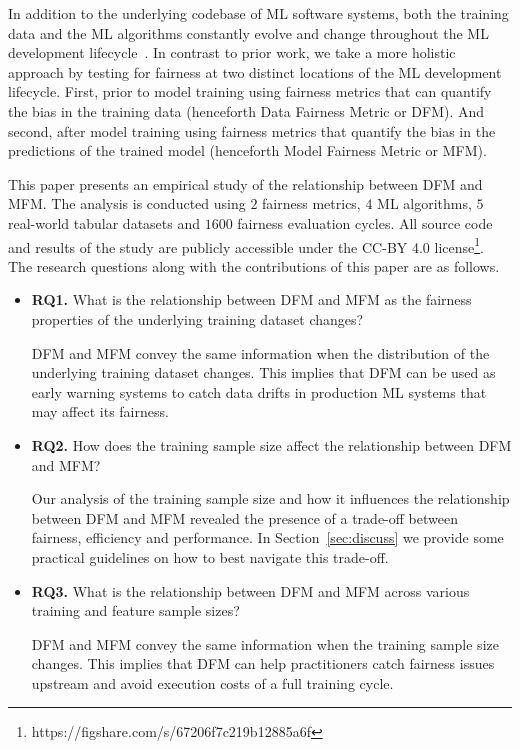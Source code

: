 \documentclass{article}
\begin{document}
In addition to the underlying codebase of ML software systems, both
the training data and the ML algorithms constantly evolve and change
throughout the ML development
lifecycle \cite{sculley2015hidden,bosch2021engineering,hutchinson2021towards}. In
contrast to prior work, we take a more holistic approach by testing
for fairness at two distinct locations of the ML development
lifecycle. First, prior to model training using fairness metrics that
can quantify the bias in the training data (henceforth Data Fairness
Metric or DFM). And second, after model training using fairness
metrics that quantify the bias in the predictions of the trained model
(henceforth Model Fairness Metric or MFM).

This paper presents an empirical study of the relationship between DFM
and MFM. The analysis is conducted using $2$ fairness metrics, $4$ ML
algorithms, $5$ real-world tabular datasets and $1600$ fairness
evaluation cycles. All source code and results of the study are
publicly accessible under the CC-BY 4.0
license\footnote{https://figshare.com/s/67206f7c219b12885a6f}. The
research questions along with the contributions of this paper are as
follows.

\begin{itemize}
  \item{\textbf{RQ1.}} What is the relationship between DFM and MFM as the
    fairness properties of the underlying training dataset changes?

    DFM and MFM convey the same information when the distribution of
    the underlying training dataset changes. This implies that DFM can
    be used as early warning systems to catch data drifts in
    production ML systems that may affect its fairness.

  \item{\textbf{RQ2.}} How does the training sample size affect the
    relationship between DFM and MFM?

    Our analysis of the training sample size and how it influences the
    relationship between DFM and MFM revealed the presence of
    a trade-off between fairness, efficiency and performance. In
    Section \ref{sec:discuss} we provide some practical guidelines on
    how to best navigate this trade-off.

  \item{\textbf{RQ3.}} What is the relationship between DFM and MFM across
    various training and feature sample sizes?

    DFM and MFM convey the same information when the training sample
    size changes. This implies that DFM can help practitioners catch
    fairness issues upstream and avoid execution costs of a full
    training cycle.
\end{itemize}
\end{document}
